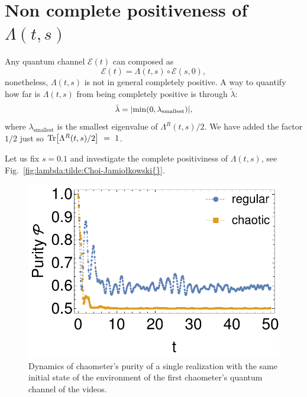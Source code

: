 \documentclass[10pt,letterpaper]{article}
\newcommand{\Fref}[1]{Fig.~\ref{#1}}
\newcommand{\mcE}{\mathcal E}
\newcommand{\jami}{Jamiołkowski}
\begin{document}
\section{Non complete positiveness of $\Lambda(t, s)$}
Any quantum channel $\mcE(t)$ can composed as 
\begin{equation}\label{eq:Lambda}
\mcE(t) = 
\Lambda(t,s) \circ \mcE(s, 0),
\end{equation}
nonetheless, $\Lambda(t,s)$ is not in general completely positive. A way to 
quantify how far is $\Lambda(t,s)$ from being completely positive is through 
$\tilde \lambda$:
\begin{equation}\label{eq:lambda:tilde}
\tilde \lambda = 
\abs{\min(0, \lambda_{\text{smallest}})},
\end{equation}
where $\lambda_{\text{smallest}}$ is the smallest eigenvalue of 
$\Lambda^R(t,s)/2$. We have added the factor $1/2$ just so 
$\Tr[\Lambda^R(t,s)/2]~=~1$.

Let us fix $s=0.1$ and investigate the complete positiviness of 
$\Lambda(t, s)$, see \Fref{fig:lambda:tilde:Choi-\jami{}}.

\begin{figure}
\centering
\includegraphics[width=.6\textwidth]{purity_one_realization.pdf}
\caption{Dynamics of chaometer's purity of a single realization 
with the same initial state of the environment of the first chaometer's 
quantum channel of the videos.}
\label{fig:purity:one:realization}
\end{figure}
\end{document}
